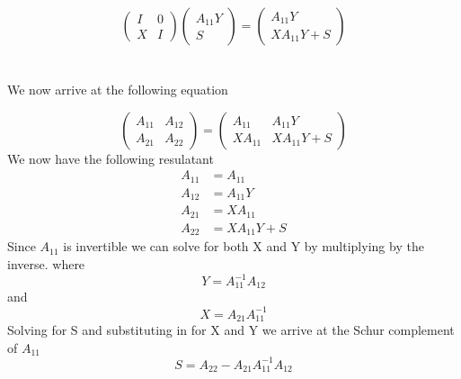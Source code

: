 \documentclass{article}
\begin{document}
\begin{equation}
\begin{pmatrix}
I & 0 \\
X & I 
\end{pmatrix}
\begin{pmatrix}
A_{11}Y\\
S
\end{pmatrix}
=
\begin{pmatrix}
A_{11}Y \\
XA_{11}Y+S
\end{pmatrix}
\end{equation}
\\
\\
We now arrive at the following equation

\begin{equation}
\begin{pmatrix}
A_{11} & A_{12} \\
A_{21} & A_{22} 
\end{pmatrix}
=
\begin{pmatrix}
A_{11}& A_{11}Y \\
XA_{11} & XA_{11}Y +S
\end{pmatrix}
\end{equation}
We now have the following resulatant
\begin{align*}
 A_{11}&=A_{11}  \\
A_{12}&=A_{11}Y \\
A_{21}&=XA_{11}\\
A_{22}&=XA_{11}Y+S
\end{align*}
Since $ A_{11} $ is invertible we can solve for both X and Y by multiplying by the inverse.
where 
$$ Y=A^{-1}_{11}A_{12}$$
and
$$ X=A_{21}A^{-1}_{11}$$
Solving for S and substituting in for X and Y we arrive at the Schur complement of $A_{11}$
 $$ S= A_{22}-A_{21}A^{-1}_{11}A_{12} $$
\end{document}
